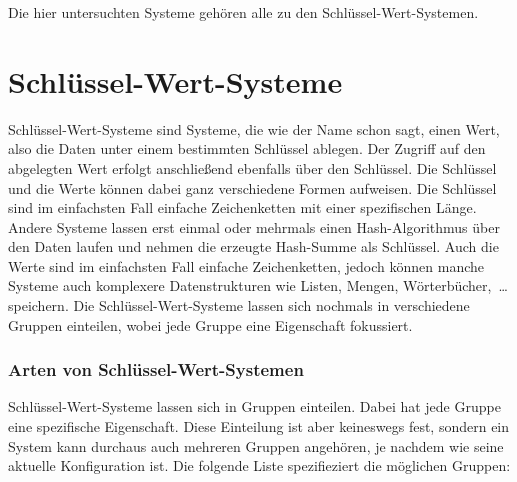 Die hier untersuchten Systeme gehören alle zu den Schlüssel-Wert-Systemen.

\section{Schlüssel-Wert-Systeme}
Schlüssel-Wert-Systeme sind Systeme, die wie der Name schon sagt, einen Wert,
also die Daten unter einem bestimmten Schlüssel ablegen. Der Zugriff auf den
abgelegten Wert erfolgt anschließend ebenfalls über den Schlüssel. Die Schlüssel
und die Werte können dabei ganz verschiedene Formen aufweisen. Die Schlüssel
sind im einfachsten Fall einfache Zeichenketten mit einer spezifischen Länge.
Andere Systeme lassen erst einmal oder mehrmals einen Hash-Algorithmus über den
Daten laufen und nehmen die erzeugte Hash-Summe als Schlüssel. Auch die Werte
sind im einfachsten Fall einfache Zeichenketten, jedoch können manche Systeme
auch komplexere Datenstrukturen wie Listen, Mengen, Wörterbücher,~\dots{}
speichern. Die Schlüssel-Wert-Systeme lassen sich nochmals in verschiedene
Gruppen einteilen, wobei jede Gruppe eine Eigenschaft fokussiert.

\subsubsection{Arten von Schlüssel-Wert-Systemen}
Schlüssel-Wert-Systeme lassen sich in Gruppen einteilen. Dabei hat jede Gruppe
eine spezifische Eigenschaft. Diese Einteilung ist aber keineswegs fest, sondern
ein System kann durchaus auch mehreren Gruppen angehören, je nachdem wie seine
aktuelle Konfiguration ist. Die folgende Liste spezifieziert die möglichen
Gruppen:

